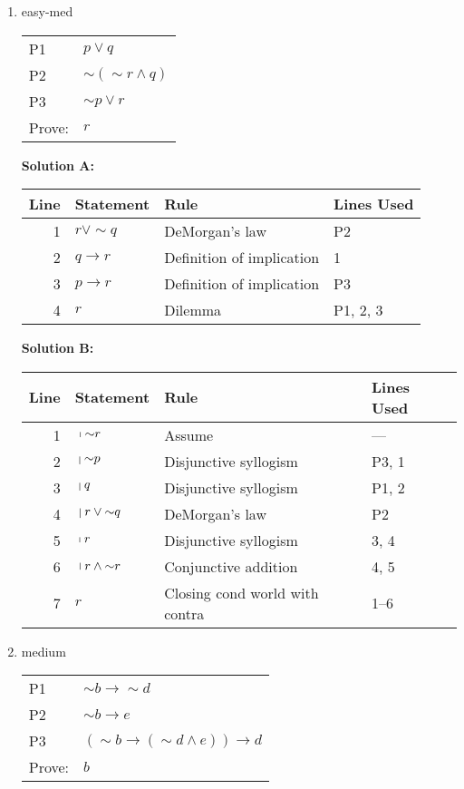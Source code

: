 \documentclass[10pt, letterpaper]{article}
\newcommand{\nott}{{\sim}}
\begin{document}
\begin{enumerate}

\newpage
\item easy-med

\begin{tabular}[t]{ll}
P1 & $p \lor q$ \\
P2 & $\nott (\nott r \land q)$ \\
P3 & $\nott p \lor r$ \\ \hline
Prove: & $r$
\end{tabular}

\textbf{Solution A:}

\begin{tabular}{|r|l|l|l|} \hline
Line & Statement & Rule & Lines Used \\ \hline
1 & $r \lor \nott q$ & DeMorgan's law & P2 \\ \hline
2 & $q \to r$ & Definition of implication & 1 \\ \hline
3 & $p \to r$ & Definition of implication & P3 \\ \hline
4 & $r$ & Dilemma & P1, 2, 3 \\ \hline
\end{tabular}

\textbf{Solution B:}   
     
\begin{tabular}{|r|l|l|l|} \hline
Line & Statement & Rule & Lines Used \\ \hline
1 & $\ \vline \ \nott r  $& Assume & --- \\ \hline
2 & $\ \vline \ \nott p$ & Disjunctive syllogism & P3, 1 \\ \hline
3 & $\ \vline \ q$ & Disjunctive syllogism & P1, 2 \\ \hline
4 & $\ \vline \ r \lor \nott q$ & DeMorgan's law & P2 \\ \hline
5 & $\ \vline \ r$ & Disjunctive syllogism & 3, 4 \\ \hline
6 & $\ \vline \ r \land \nott r$ & Conjunctive addition & 4, 5 \\ \hline
7 & $r$ & Closing cond world with contra & 1--6 \\ \hline
\end{tabular}
 
\newpage
\item medium

\begin{tabular}[t]{ll}
P1 & $\nott b \to \nott d$ \\
P2 & $\nott b \to e$ \\
P3 & $(\nott b \to (\nott d \land e)) \to d$ \\ \hline
Prove: & $b$
\end{tabular}


\end{enumerate}
\end{document}
